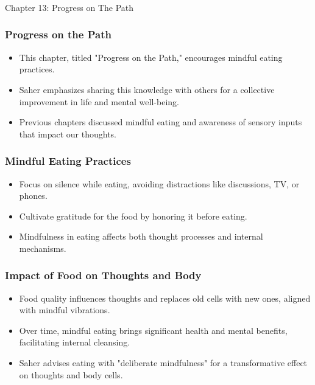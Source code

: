 \begin{frame}[fragile]\frametitle{}
\begin{center}
{\Large Chapter 13: Progress on The Path }
\end{center}
\end{frame}

\begin{frame}[fragile]\frametitle{Progress on the Path}
    \begin{itemize}
        \item This chapter, titled "Progress on the Path," encourages mindful eating practices.
        \item Saher emphasizes sharing this knowledge with others for a collective improvement in life and mental well-being.
        \item Previous chapters discussed mindful eating and awareness of sensory inputs that impact our thoughts.
    \end{itemize}
\end{frame}

\begin{frame}[fragile]\frametitle{Mindful Eating Practices}
    \begin{itemize}
        \item Focus on silence while eating, avoiding distractions like discussions, TV, or phones.
        \item Cultivate gratitude for the food by honoring it before eating.
        \item Mindfulness in eating affects both thought processes and internal mechanisms.
    \end{itemize}
\end{frame}

\begin{frame}[fragile]\frametitle{Impact of Food on Thoughts and Body}
    \begin{itemize}
        \item Food quality influences thoughts and replaces old cells with new ones, aligned with mindful vibrations.
        \item Over time, mindful eating brings significant health and mental benefits, facilitating internal cleansing.
        \item Saher advises eating with "deliberate mindfulness" for a transformative effect on thoughts and body cells.
    \end{itemize}
\end{frame}


